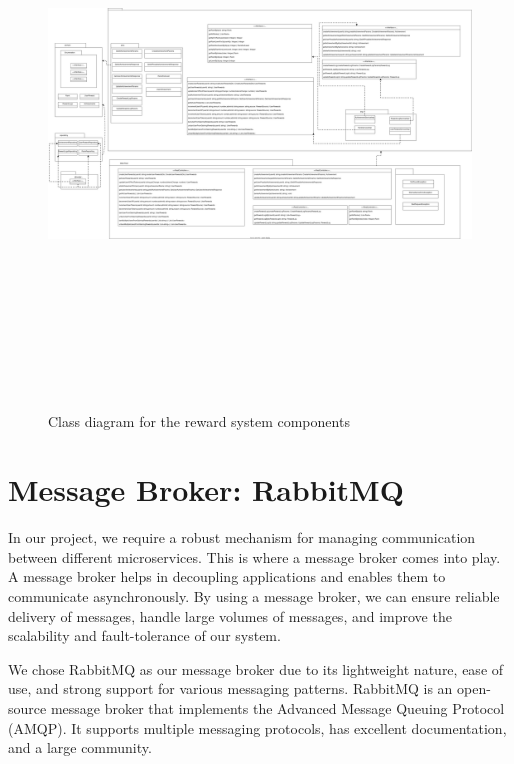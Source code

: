 \begin{landscape}
    \begin{figure}[H]
        \centering
        \includegraphics[width=24cm, height=15cm]{src/assets/diagrams/nestclass.png}
        \caption{Class diagram for the reward system components}
        \label{fig:class-reward-system}
    \end{figure}
\end{landscape}

\section{Message Broker: RabbitMQ}

In our project, we require a robust mechanism for managing communication between different microservices. This is where a message broker comes into play. A message broker helps in decoupling applications and enables them to communicate asynchronously. By using a message broker, we can ensure reliable delivery of messages, handle large volumes of messages, and improve the scalability and fault-tolerance of our system.

We chose RabbitMQ as our message broker due to its lightweight nature, ease of use, and strong support for various messaging patterns. RabbitMQ is an open-source message broker that implements the Advanced Message Queuing Protocol (AMQP). It supports multiple messaging protocols, has excellent documentation, and a large community.

